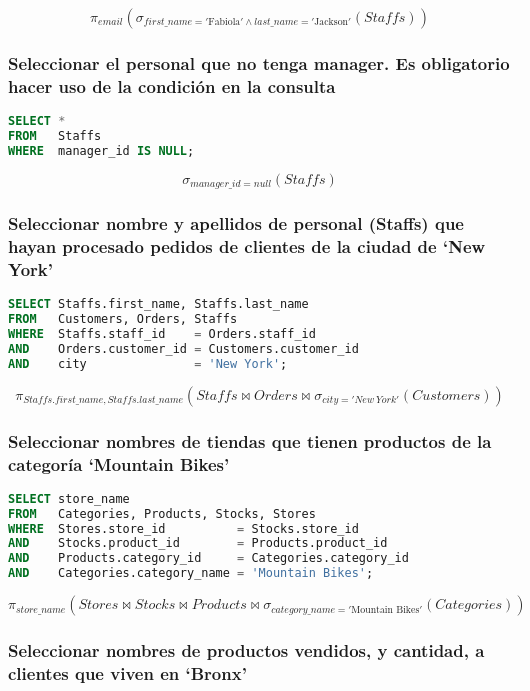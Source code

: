\[\pi_{email}(\sigma_{first\_name='\text{Fabiola}'\land last\_name='\text{Jackson}'}(Staffs))\]

\subsubsection{Seleccionar el personal que no tenga manager. Es obligatorio hacer uso de la condición  en la consulta}

\begin{lstlisting}[language=SQL]
SELECT *
FROM   Staffs
WHERE  manager_id IS NULL;
\end{lstlisting}

\[\sigma_{manager\_id=null}(Staffs)\]

\subsubsection{Seleccionar nombre y apellidos de personal (Staffs) que hayan procesado pedidos de clientes de la ciudad de `New York'}

\begin{lstlisting}[language=SQL]
SELECT Staffs.first_name, Staffs.last_name
FROM   Customers, Orders, Staffs
WHERE  Staffs.staff_id    = Orders.staff_id
AND    Orders.customer_id = Customers.customer_id
AND    city               = 'New York';
\end{lstlisting}

\[\pi_{Staffs.first\_name,Staffs.last\_name}(Staffs\bowtie Orders\bowtie\sigma_{city='New\ York'}(Customers))\]

\subsubsection{Seleccionar nombres de tiendas que tienen productos de la categoría `Mountain Bikes'}

\begin{lstlisting}[language=SQL]
SELECT store_name
FROM   Categories, Products, Stocks, Stores
WHERE  Stores.store_id          = Stocks.store_id
AND    Stocks.product_id        = Products.product_id
AND    Products.category_id     = Categories.category_id
AND    Categories.category_name = 'Mountain Bikes';
\end{lstlisting}

\[\pi_{store\_name}(Stores\bowtie Stocks\bowtie Products\bowtie\sigma_{category\_name='\text{Mountain Bikes}'}(Categories))\]

\subsubsection{Seleccionar nombres de productos vendidos, y cantidad, a clientes que viven en `Bronx'}

